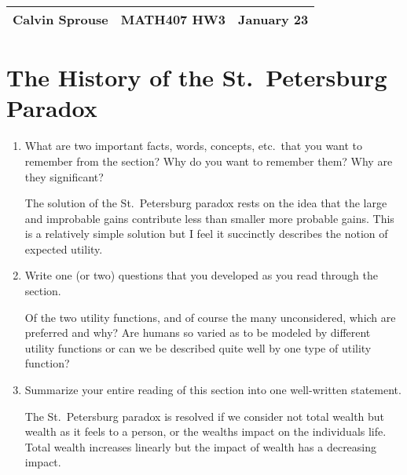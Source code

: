 \documentclass[a4paper, 12pt]{config/homework}
\begin{document}
\noindent
\begin{tabularx}{\textwidth}{>{\centering\arraybackslash}X>{\centering\arraybackslash}X>{\centering\arraybackslash}X}
Calvin Sprouse & MATH407 HW3 & 2024 January 23\\
\midrule
\end{tabularx}


\section{The History of the St.\ Petersburg Paradox}
\begin{enumerate}[label=\roman*.]
\item What are two important facts, words, concepts, etc.\ that you want to remember from the section? Why do you want to remember them? Why are they significant?

The solution of the St.\ Petersburg paradox rests on the idea that the large and improbable gains contribute less than smaller more probable gains. This is a relatively simple solution but I feel it succinctly describes the notion of expected utility.

\item Write one (or two) questions that you developed as you read through the section.

Of the two utility functions, and of course the many unconsidered, which are preferred and why? Are humans so varied as to be modeled by different utility functions or can we be described quite well by one type of utility function?

\item Summarize your entire reading of this section into one well-written statement.

The St.\ Petersburg paradox is resolved if we consider not total wealth but wealth as it feels to a person, or the wealths impact on the individuals life. Total wealth increases linearly but the impact of wealth has a decreasing impact.

\end{enumerate}
\end{document}
